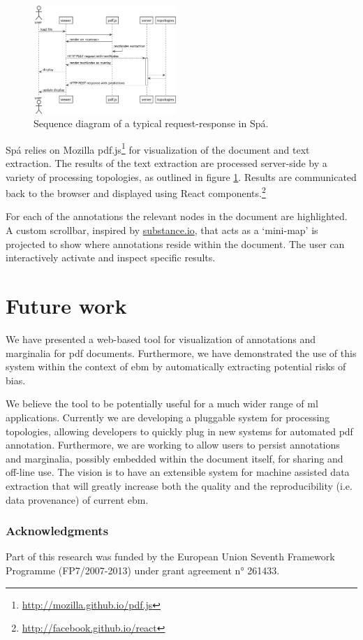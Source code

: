 \documentclass[runningheads,a4paper]{llncs}
\begin{document}
\label{section:architecture}
\begin{figure}
  \vspace{-2em}
  \includegraphics[width=0.48\textwidth]{./diagrams/sequence.pdf}
  \vspace{-1em}
  \caption{\label{fig:sequence}Sequence diagram of a typical request-response in Spá.}
  \vspace{-1.5em}
\end{figure}

Spá relies on Mozilla pdf.js\footnote{\url{http://mozilla.github.io/pdf.js}} for visualization of the document and text extraction.
The results of the text extraction are processed server-side by a variety of processing topologies, as outlined in figure \ref{fig:sequence}.
Results are communicated back to the browser and displayed using React components.\footnote{\url{http://facebook.github.io/react}}

For each of the annotations the relevant nodes in the document are highlighted.
A custom scrollbar, inspired by \href{http://substance.io/}{substance.io}, that acts as a `mini-map' is projected to show where annotations reside within the document.
The user can interactively activate and inspect specific results.

\section{Future work}
We have presented a web-based tool for visualization of annotations and marginalia for \ac{pdf} documents.
Furthermore, we have demonstrated the use of this system within the context of \acl{ebm} by automatically extracting potential risks of bias.

We believe the tool to be potentially useful for a much wider range of \acl{ml} applications.
Currently we are developing a pluggable system for processing topologies, allowing developers to quickly plug in new systems for automated \ac{pdf} annotation.
Furthermore, we are working to allow users to persist annotations and marginalia, possibly embedded within the document itself, for sharing and off-line use.
The vision is to have an extensible system for machine assisted data extraction that will greatly increase both the quality and the reproducibility (i.e. data provenance) of current \acl{ebm}.

\subsubsection{Acknowledgments}
Part of this research was funded by the European Union Seventh Framework Programme (FP7/2007-2013) under grant agreement n° 261433. %




\end{document}
